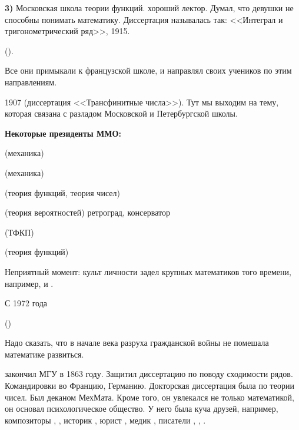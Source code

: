 \documentclass[a4paper,oneside,fleqn,10pt]{article}
\begin{document}
\textbf{3)} Московская школа теории функций.
  хороший лектор.
Думал, что девушки не способны понимать математику.
Диссертация  называлась так: <<Интеграл и тригонометрический ряд>>, 1915.

 ().

Все они примыкали к французской школе, и 
направлял своих учеников по этим направлениям.

1907  (диссертация <<Трансфинитные числа>>). Тут мы выходим на тему, которая
связана с разладом Московской и Петербургской школы.

\textbf{Некоторые президенты ММО:}

\begin{items}{-2}
\item {}  (механика)
\item {}  (механика)
\item {}  (теория функций, теория чисел)
\item {}  (теория вероятностей) ретроград, консерватор
\item {}  (ТФКП)
\item {} 
\item {}  (теория функций)

Неприятный момент: культ личности задел крупных математиков того времени,
например,  и .

\item С 1972 года 

\item {} ()
\end{items}

Надо сказать, что в начале века разруха гражданской войны не помешала
математике развиться.

 закончил МГУ в 1863 году. Защитил диссертацию по поводу сходимости рядов.
Командировки во Францию, Германию. Докторская диссертация была по теории чисел.
Был деканом МехМата. Кроме того, он увлекался не только математикой, он основал психологическое общество.
У него была куча друзей, например, композиторы , ,
историк , юрист , медик ,
писатели , , .
\end{document}
